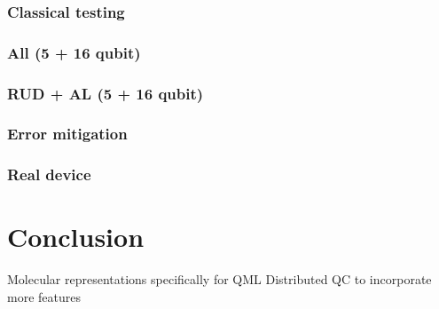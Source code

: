\documentclass[journal=jacsat,manuscript=article]{achemso}
\begin{document}
\subsubsection{Classical testing}
\subsubsection{All (5 + 16 qubit)}
\subsubsection{RUD + AL (5 + 16 qubit)}
\subsubsection{Error mitigation}
\subsubsection{Real device}

\section{Conclusion}

Molecular representations specifically for QML
Distributed QC to incorporate more features


\end{document}
